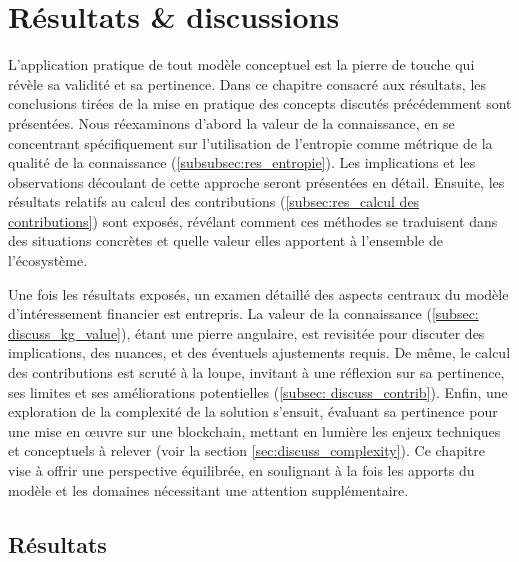 \chapter{Résultats \& discussions}\label{chap:result_discussions}
  
L'application pratique de tout modèle conceptuel est la pierre de touche qui révèle sa validité et sa pertinence. Dans ce chapitre consacré aux résultats, les conclusions tirées de la mise en pratique des concepts discutés précédemment sont présentées. Nous réexaminons d'abord la valeur de la connaissance, en se concentrant spécifiquement sur l'utilisation de l'entropie comme métrique de la qualité de la connaissance (\ref{subsubsec:res_entropie}). Les implications et les observations découlant de cette approche seront présentées en détail. Ensuite, les résultats relatifs au calcul des contributions (\ref{subsec:res_calcul des contributions}) sont exposés, révélant comment ces méthodes se traduisent dans des situations concrètes et quelle valeur elles apportent à l'ensemble de l'écosystème.

Une fois les résultats exposés, un examen détaillé des aspects centraux du modèle d'intéressement financier est entrepris. La valeur de la connaissance (\ref{subsec: discuss_kg_value}), étant une pierre angulaire, est revisitée pour discuter des implications, des nuances, et des éventuels ajustements requis. De même, le calcul des contributions est scruté à la loupe, invitant à une réflexion sur sa pertinence, ses limites et ses améliorations potentielles (\ref{subsec: discuss_contrib}). Enfin, une exploration de la complexité de la solution s'ensuit, évaluant sa pertinence pour une mise en œuvre sur une blockchain, mettant en lumière les enjeux techniques et conceptuels à relever (voir la section \ref{sec:discuss_complexity}). Ce chapitre vise à offrir une perspective équilibrée, en soulignant à la fois les apports du modèle et les domaines nécessitant une attention supplémentaire.

\section{Résultats} \label{sec: resultats}


